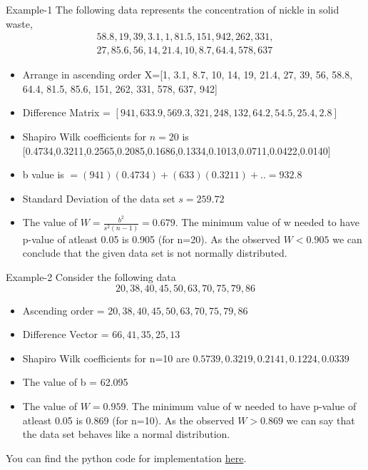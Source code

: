 \documentclass[10pt]{beamer}
\begin{document}
\begin{frame}{Example-1}
 The following data represents the concentration of nickle in solid waste,\begin{align*} 58.8,19,39,3.1,1,81.5,151,942,262,
    331,\\27,85.6,56,14,21.4,10,8.7,64.4,578,637 \end{align*}
    \begin{itemize}
        \item Arrange in ascending order X=[1, 3.1, 8.7, 10, 14, 19, 21.4, 27, 39, 56, 58.8, 64.4, 81.5, 85.6, 151, 262, 331, 578, 637, 942]
        \item Difference Matrix = $[ 941,633.9,569.3,321,248,132,64.2,54.5,25.4,2.8]$
        \item Shapiro Wilk coefficients for $n=20$ is [0.4734,0.3211,0.2565,0.2085,0.1686,0.1334,0.1013,0.0711,0.0422,0.0140]
        \item b value is $=(941)(0.4734)+(633)(0.3211)+.. = 932.8$
        \item Standard Deviation of the data set $s=259.72$
        \item The value of $W=\frac{b^{2}}{s^{2}(n-1)}=0.679$. The minimum value of w needed to have p-value of atleast 0.05 is 0.905 (for n=20). As the observed $W<0.905$ we can conclude that the given data set is not normally distributed.
    \end{itemize}
\end{frame}
\begin{frame}{Example-2}
Consider the following data
$$20,38,40,45,50,63,70,75,79,86$$
\begin{itemize}
    \item Ascending order = $20,38,40,45,50,63,70,75,79,86$
    \item Difference Vector = $66,41,35,25,13$
    \item Shapiro Wilk coefficients for n=10 are $0.5739,0.3219,0.2141,0.1224,0.0339$
    \item The value of b = 62.095
    \item The value of $W=0.959$. The minimum value of w needed to have p-value of atleast 0.05 is 0.869 (for n=10). As the observed $W>0.869$ we can say that the data set behaves like a normal distribution. 
\end{itemize}
You can find the python code for implementation
\href{https://github.com/cmaspi/verifying_CLT/blob/main/codes/examples.ipynb}{here}.
\end{frame}
\end{document}
